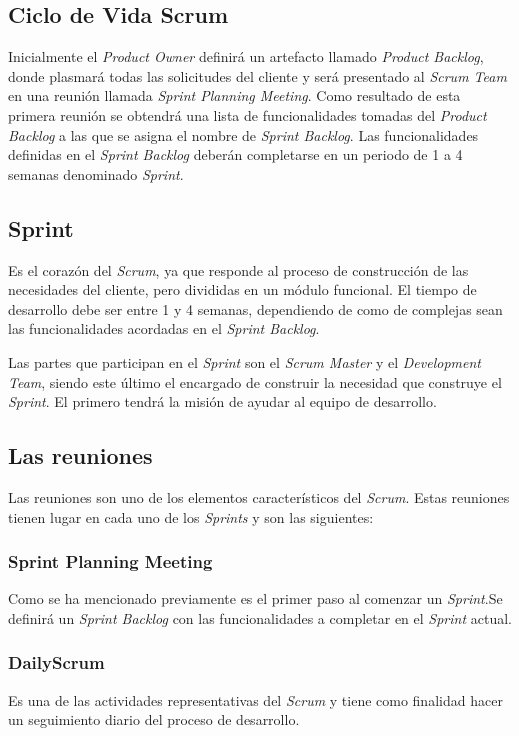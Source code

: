 \subsection{Ciclo de Vida Scrum}
Inicialmente el \textit{Product Owner} definirá un artefacto llamado \textit{Product Backlog}, donde plasmará todas las solicitudes del cliente y será presentado al \textit{Scrum Team} en una reunión llamada \textit{Sprint Planning Meeting}.
Como resultado de esta primera reunión se obtendrá una lista de funcionalidades tomadas del \textit{Product Backlog} a las que se asigna el nombre de \textit{Sprint Backlog}.
Las funcionalidades definidas en el \textit{Sprint Backlog} deberán completarse en un periodo de 1 a 4 semanas denominado \textit{Sprint}.

\subsection{Sprint}
Es el corazón del \textit{Scrum}, ya que responde al proceso de construcción de las necesidades del cliente, pero divididas en un módulo funcional. 
El tiempo de desarrollo debe ser entre 1 y 4 semanas, dependiendo de como de complejas sean las funcionalidades acordadas en el \textit{Sprint Backlog}.

Las partes que participan en el \textit{Sprint} son el \textit{Scrum Master} y el \textit{Development Team}, siendo este último el encargado de construir la necesidad que construye el \textit{Sprint}. El primero tendrá la misión de ayudar al equipo de desarrollo.

\subsection{Las reuniones}
Las reuniones son uno de los elementos característicos del \textit{Scrum}. Estas reuniones tienen lugar en cada uno de los \textit{Sprints} y son las siguientes:
\subsubsection{Sprint Planning Meeting}
Como se ha mencionado previamente es el primer paso al comenzar un \textit{Sprint}.Se definirá un \textit{Sprint Backlog} con las funcionalidades a completar en el \textit{Sprint} actual.
\subsubsection{DailyScrum}
Es una de las actividades representativas del \textit{Scrum} y tiene como finalidad hacer un seguimiento diario del proceso de desarrollo.

